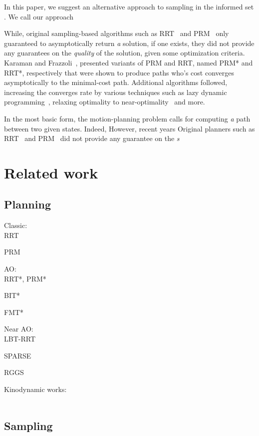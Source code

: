 \documentclass[letterpaper, 10 pt, conference]{ieeeconf}  %
\begin{document}
In this paper, we suggest an alternative approach to sampling in the informed set \Cinf.
We call our approach 


While, original sampling-based algorithms such as RRT~\cite{LK01} and PRM~\cite{KSLO96} only guaranteed to asymptotically return \emph{a} solution, if one exists, they did not provide any guarantees on the \emph{quality} of the solution, given some optimization criteria.
Karaman and Frazzoli~\cite{KF11}, presented variants of PRM and RRT, named PRM* and RRT*, respectively that were shown to produce paths who's cost converges asymptotically to the minimal-cost path.
Additional algorithms followed, increasing the converges rate by various techniques such as lazy dynamic programming~\cite{GSB15, JSCP15}, relaxing optimality to near-optimality~\cite{DB14, SH16} and more.


In the most basic form, the motion-planning problem calls for computing \emph{a} path between two given states.
Indeed, 
However, recent years 
Original planners such as RRT~\cite{LK01} and PRM~\cite{KSLO96} did not provide any guarantee on the \emph{s}


\section{Related work}


\subsection{Planning}


Classic:\\
RRT~\cite{LK01}

PRM~\cite{KSLO96}

AO:\\
RRT*, PRM*~\cite{KF11}

BIT*~\cite{GSB15}

FMT*~\cite{JSCP15}

Near AO:\\
LBT-RRT~\cite{SH16}

SPARSE~\cite{DB14}


RGGS~\cite{SSH16}


Kinodynamic works:\\~\cite{SL14, XBPA15, WB13, KF10}

\subsection{Sampling}
\end{document}
